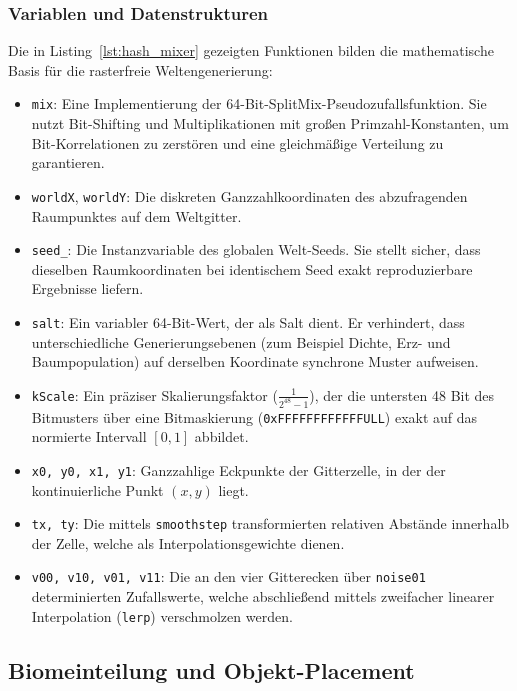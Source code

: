 \documentclass[
  a4paper,
  11pt,
  twoside,
  BCOR=8mm,           %
  headings=big,
  numbers=noenddot,
  listof=totoc,       %
  captions=tableheading,
]{scrreprt}
\begin{document}
\subsubsection{Variablen und Datenstrukturen}
Die in Listing~\ref{lst:hash_mixer} gezeigten Funktionen bilden die mathematische Basis für die rasterfreie Weltengenerierung:

\begin{itemize}
    \item \texttt{mix}: Eine Implementierung der 64-Bit-SplitMix-Pseudozufallsfunktion. Sie nutzt Bit-Shifting und Multiplikationen mit großen Primzahl-Konstanten, um Bit-Korrelationen zu zerstören und eine gleichmäßige Verteilung zu garantieren.
    \item \texttt{worldX}, \texttt{worldY}: Die diskreten Ganzzahlkoordinaten des abzufragenden Raumpunktes auf dem Weltgitter.
    \item \texttt{seed\_}: Die Instanzvariable des globalen Welt-Seeds. Sie stellt sicher, dass dieselben Raumkoordinaten bei identischem Seed exakt reproduzierbare Ergebnisse liefern.
    \item \texttt{salt}: Ein variabler 64-Bit-Wert, der als Salt dient. Er verhindert, dass unterschiedliche Generierungsebenen (zum Beispiel Dichte, Erz- und Baumpopulation) auf derselben Koordinate synchrone Muster aufweisen.
    \item \texttt{kScale}: Ein präziser Skalierungsfaktor ($\frac{1}{2^{48}-1}$), der die untersten 48 Bit des Bitmusters über eine Bitmaskierung (\texttt{0xFFFFFFFFFFFFULL}) exakt auf das normierte Intervall $[0, 1]$ abbildet.
    \item \texttt{x0, y0, x1, y1}: Ganzzahlige Eckpunkte der Gitterzelle, in der der kontinuierliche Punkt $(x, y)$ liegt.
    \item \texttt{tx, ty}: Die mittels \texttt{smoothstep} transformierten relativen Abstände innerhalb der Zelle, welche als Interpolationsgewichte dienen.
    \item \texttt{v00, v10, v01, v11}: Die an den vier Gitterecken über \texttt{noise01} determinierten Zufallswerte, welche abschließend mittels zweifacher linearer Interpolation (\texttt{lerp}) verschmolzen werden.
\end{itemize}

\subsection{Biomeinteilung und Objekt-Placement}
\label{sec:umsetzung_biome}
\end{document}
